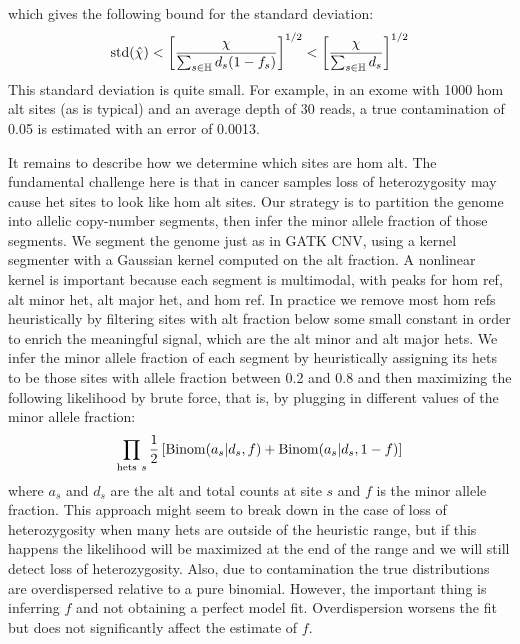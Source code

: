 \documentclass[nofootinbib,amssymb,amsmath]{revtex4}
\begin{document}
which gives the following bound for the standard deviation:
\begin{equation}
{\rm std}(\hat{\chi}) < \left[ \frac{ \chi }{  \sum_{s \in \mathbb{H}} d_s (1 - f_s) } \right]^{1/2} < \left[ \frac{ \chi }{  \sum_{s \in \mathbb{H}} d_s} \right]^{1/2}
\end{equation}
This standard deviation is quite small.  For example, in an exome with 1000 hom alt sites (as is typical) and an average depth of 30 reads, a true contamination of 0.05 is estimated with an error of 0.0013.

It remains to describe how we determine which sites are hom alt.  The fundamental challenge here is that in cancer samples loss of heterozygosity may cause het sites to look like hom alt sites.  Our strategy is to partition the genome into allelic copy-number segments, then infer the minor allele fraction of those segments.  We segment the genome just as in GATK CNV, using a kernel segmenter with a Gaussian kernel computed on the alt fraction.  A nonlinear kernel is important because each segment is multimodal, with peaks for hom ref, alt minor het, alt major het, and hom ref.  In practice we remove most hom refs heuristically by filtering sites with alt fraction below some small constant in order to enrich the meaningful signal, which are the alt minor and alt major hets.  We infer the minor allele fraction of each segment by heuristically assigning its hets to be those sites with allele fraction between 0.2 and 0.8 and then maximizing the following likelihood by brute force, that is, by plugging in different values of the minor allele fraction:
\begin{equation}
\prod_{{\rm hets~}s} \frac{1}{2} \left[ {\rm Binom}(a_s | d_s, f) + {\rm Binom}(a_s | d_s, 1 - f)    \right] \label{het-maf}
\end{equation}
where $a_s$ and $d_s$ are the alt and total counts at site $s$ and $f$ is the minor allele fraction.  This approach might seem to break down in the case of loss of heterozygosity when many hets are outside of the heuristic range, but if this happens the likelihood will be maximized at the end of the range and we will still detect loss of heterozygosity.  Also, due to contamination the true distributions are overdispersed relative to a pure binomial.  However, the important thing is inferring $f$ and not obtaining a perfect model fit.  Overdispersion worsens the fit but does not significantly affect the estimate of $f$.
\end{document}
